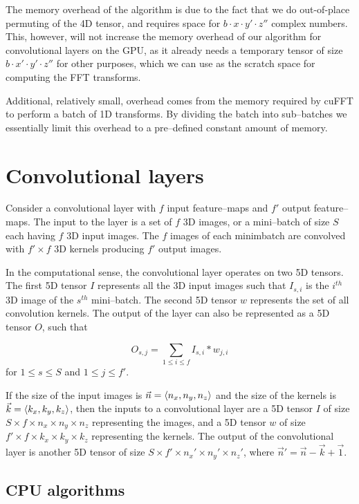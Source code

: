 \documentclass[conference]{IEEEtran}
\DeclarePairedDelimiter{\angled}{\langle}{\rangle}
\begin{document}
  The memory overhead of the algorithm is due to the fact that we do
  out-of-place permuting of the 4D tensor, and requires space for $b
  \cdot x \cdot y' \cdot z''$ complex numbers.  This, however, will
  not increase the memory overhead of our algorithm for convolutional
  layers on the GPU, as it already needs a temporary tensor of size $b
  \cdot x' \cdot y' \cdot z''$ for other purposes, which we can use as
  the scratch space for computing the FFT transforms.

  Additional, relatively small, overhead comes from the memory
  required by cuFFT to perform a batch of 1D transforms.  By dividing
  the batch into sub--batches we essentially limit this overhead to a
  pre--defined constant amount of memory.

\section{Convolutional layers}

  Consider a convolutional layer with $f$ input feature--maps and $f'$
  output feature--maps.  The input to the layer is a set of $f$ 3D
  images, or a mini--batch of size $S$ each having $f$ 3D input
  images.  The $f$ images of each minimbatch are convolved with $f'
  \times f$ 3D kernels producing $f'$ output images.

  In the computational sense, the convolutional layer operates on two
  5D tensors.  The first 5D tensor $I$ represents all the 3D input
  images such that $I_{s,i}$ is the $i^{th}$ 3D image of the $s^{th}$
  mini--batch.  The second 5D tensor $w$ represents the set of all
  convolution kernels.  The output of the layer can also be
  represented as a 5D tensor $O$, such that

  $$O_{s,j} = \sum_{1 \le i \le f} I_{s,i} \ast w_{j,i}$$
  for $1 \le s \le S$ and $1 \le j \le f'$.

  If the size of the input images is $\vec{n} = \angled{n_x, n_y,
  n_z}$ and the size of the kernels is $\vec{k}
  = \angled{k_x,k_y,k_z}$, then the inputs to a convolutional layer
  are a 5D tensor $I$ of size $S \times f \times n_x \times n_y \times
  n_z$ representing the images, and a 5D tensor $w$ of size $f' \times
  f \times k_x \times k_y \times k_z$ representing the kernels.  The
  output of the convolutional layer is another 5D tensor of size
  $S \times f' \times n_x' \times n_y' \times n_z'$, where $\vec{n}'
  = \vec{n} - \vec{k} + \vec{1}$.

\subsection{CPU algorithms}
\end{document}
